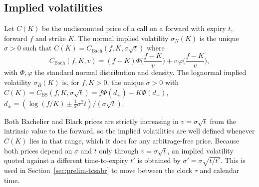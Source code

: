 \documentclass[../../../main.tex]{subfiles}
\begin{document}
\subsection{Implied volatilities}

\begin{definition}\label{def:prelim-implied}
Let $C(K)$ be the undiscounted price of a call on a forward with expiry $t$, forward $f$ and strike $K$. The normal implied volatility $\sigma_N(K)$ is the unique $\sigma>0$ such that $C(K)=C_{\mathrm{Bach}}(f,K,\sigma\sqrt t)$ where
\[
C_{\mathrm{Bach}}(f,K,v)=(f-K)\Phi\Big(\frac{f-K}{v}\Big)+v\,\varphi\Big(\frac{f-K}{v}\Big),
\]
with $\Phi,\varphi$ the standard normal distribution and density. The lognormal implied volatility $\sigma_B(K)$ is, for $f,K>0$, the unique $\sigma>0$ with $C(K)=C_{\mathrm{BS}}(f,K,\sigma\sqrt t)=f\Phi(d_+)-K\Phi(d_-)$, $d_\pm=(\log(f/K)\pm\tfrac12\sigma^2t)/(\sigma\sqrt t)$.
\end{definition}

Both Bachelier and Black prices are strictly increasing in $v=\sigma\sqrt t$ from the intrinsic value to the forward, so the implied volatilities are well defined whenever $C(K)$ lies in that range, which it does for any arbitrage-free price. Because both prices depend on $\sigma$ and $t$ only through $v=\sigma\sqrt t$, an implied volatility quoted against a different time-to-expiry $t'$ is obtained by $\sigma'=\sigma\sqrt{t/t'}$. This is used in Section~\ref{sec:prelim-tcsabr} to move between the clock $\tau$ and calendar time.
\end{document}
